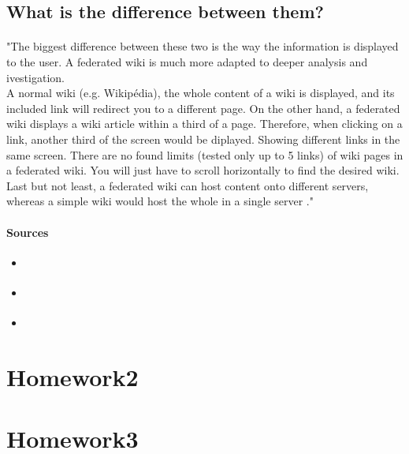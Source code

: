 \documentclass[10pt,a4paper]{article}
\begin{document}
\subsection{What is the difference between them?}
\paragraph{}"The biggest difference between these two is the way the information is displayed to the user. A federated wiki is much more adapted to deeper analysis and ivestigation.\\
A normal wiki (e.g. Wikipédia), the whole content of a wiki is displayed, and its included link will redirect you to a different page. On the other hand, a federated wiki displays a wiki article within a third of a page. Therefore, when clicking on a link, another third of the screen would be diplayed. Showing different links in the same screen. There are no found limits (tested only up to 5 links) of wiki pages in a federated wiki. You will just have to scroll horizontally to find the desired wiki.\\
Last but not least, a federated wiki can host content onto different servers, whereas a simple wiki would host the whole in a single server \cite{floref1}\cite{floref3}."\cite{floref1}

\paragraph{Sources}
\begin{itemize}
\item \cite{floref1}
\item \cite{floref2} 
\item \cite{floref3}
\end{itemize}




\newpage
\section{Homework2}
\paragraph{}



\newpage
\section{Homework3}
\paragraph{}





\newpage
\listoffigures

\newpage
{}

\end{document}
